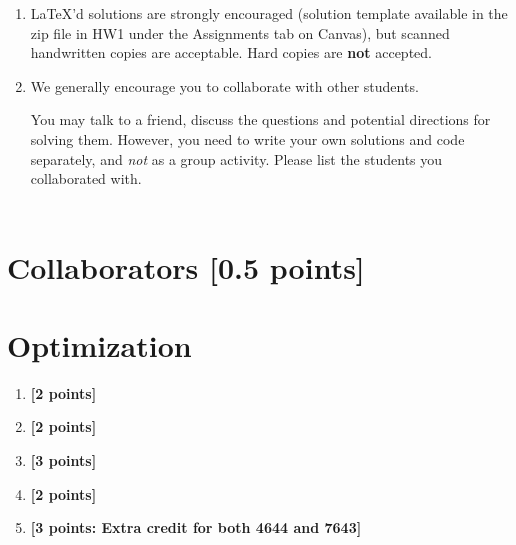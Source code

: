 \documentclass[11pt,english]{article}
\begin{document}
\begin{enumerate}
\item
     \LaTeX'd solutions are strongly encouraged (solution template
     available in the zip file in HW1 under the Assignments tab on Canvas), but scanned handwritten copies are acceptable. Hard copies are \textbf{not} accepted.


\item We generally encourage you to collaborate with other students.

You may talk to a friend, discuss the questions and potential directions for solving them. However, you need to write your own solutions and code separately, and \emph{not} as a group activity. Please list the students you collaborated with. \\ \\

\end{enumerate}
\newpage


\section{Collaborators [0.5 points]}




\section{Optimization}

\begin{enumerate}[start]

\item
\textbf{[2 points]}


\item
\textbf{[2 points]}


\item
\textbf{[3 points]}


\item
\textbf{[2 points]}


\item
\textbf{[3 points: Extra credit for both 4644 and 7643]}


\end{enumerate}
\end{document}
